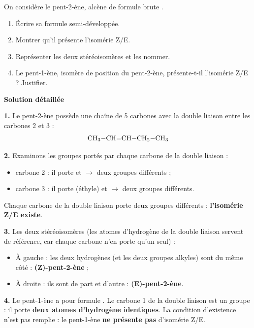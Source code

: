 \documentclass[11pt]{article}
\begin{document}
\begin{exoresolu}
On considère le pent-2-ène, alcène de formule brute .
\begin{enumerate}
\item Écrire sa formule semi-développée.
\item Montrer qu'il présente l'isomérie Z/E.
\item Représenter les deux stéréoisomères et les nommer.
\item Le pent-1-ène, isomère de position du pent-2-ène, présente-t-il l'isomérie Z/E ? Justifier.
\end{enumerate}
\tcblower
\textbf{Solution détaillée}

\textbf{1.} Le pent-2-ène possède une chaîne de 5 carbones avec la double liaison entre les carbones 2 et 3 :
\[ \ce{CH3-CH=CH-CH2-CH3} \]

\textbf{2.} Examinons les groupes portés par chaque carbone de la double liaison :
\begin{itemize}
\item carbone 2 : il porte  et  $\rightarrow$ deux groupes différents ;
\item carbone 3 : il porte  (éthyle) et  $\rightarrow$ deux groupes différents.
\end{itemize}
Chaque carbone de la double liaison porte deux groupes différents : \textbf{l'isomérie Z/E existe}.

\textbf{3.} Les deux stéréoisomères (les atomes d'hydrogène de la double liaison servent de référence, car chaque carbone n'en porte qu'un seul) :
\begin{center}
\hspace{2.2cm}
\end{center}
\begin{itemize}
\item À gauche : les deux hydrogènes (et les deux groupes alkyles) sont du même côté : \textbf{(Z)-pent-2-ène} ;
\item À droite : ils sont de part et d'autre : \textbf{(E)-pent-2-ène}.
\end{itemize}

\textbf{4.} Le pent-1-ène a pour formule . Le carbone 1 de la double liaison est un groupe  : il porte \textbf{deux atomes d'hydrogène identiques}. La condition d'existence n'est pas remplie : le pent-1-ène \textbf{ne présente pas} d'isomérie Z/E.
\end{exoresolu}
\end{document}
